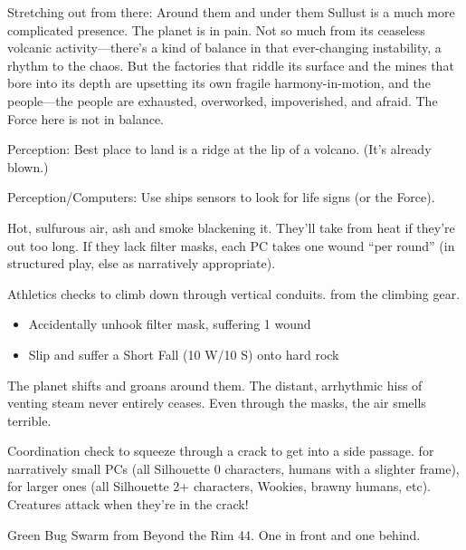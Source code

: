 \documentclass{book}
\newcommand{\df}{\difficulty}
\begin{document}
\begin{multicols}{2}
Stretching out from there: Around them and under them Sullust is a much more complicated presence. The planet is in pain. Not so much from its ceaseless volcanic activity—there’s a kind of balance in that ever-changing instability, a rhythm to the chaos. But the factories that riddle its surface and the mines that bore into its depth are upsetting its own fragile harmony-in-motion, and the people—the people are exhausted, overworked, impoverished, and afraid. The Force here is not in balance.


\difficulty\difficulty\difficulty\setback Perception: Best place to land is a ridge at the lip of a volcano. (It’s already blown.)

\difficulty\difficulty\difficulty\setback Perception/Computers: Use ships sensors to look for life signs (or the Force).

Hot, sulfurous air, ash and smoke blackening it. They’ll take \setback\setback from heat if they’re out too long.  If they lack filter masks, each PC takes one wound ``per round'' (in structured play, else as narratively appropriate).

\difficulty\difficulty\difficulty Athletics checks to climb down through vertical conduits. \boost from the climbing gear.
\begin{itemize}
  \item \threat\threat Accidentally unhook filter mask, suffering 1 wound
  \item \despair Slip and suffer a  Short Fall (10 W/10 S) onto hard rock
\end{itemize}

The planet shifts and groans around them. The distant, arrhythmic hiss of venting steam never entirely ceases. Even through the masks, the air smells terrible.

\df\df Coordination check to squeeze through a crack to get into a side passage. \boost for narratively small PCs (all Silhouette 0 characters, humans with a slighter frame), \setback for larger ones (all Silhouette 2+ characters, Wookies, brawny humans, etc). Creatures attack when they’re in the crack!

Green Bug Swarm from Beyond the Rim 44.  One in front and one behind.


\end{multicols}
\end{document}
